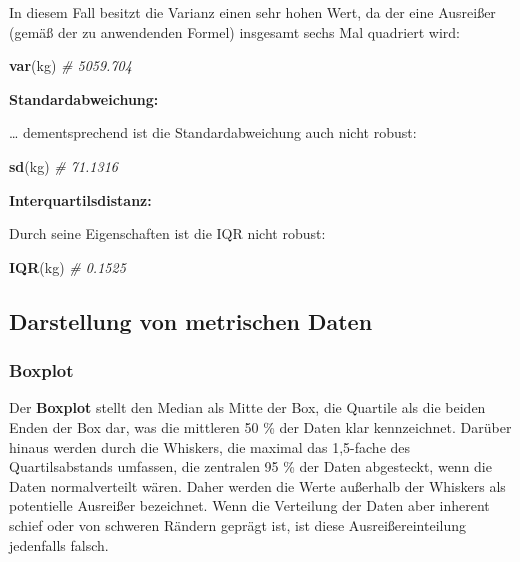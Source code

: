 \documentclass[
]{article}
\newenvironment{Shaded}{\begin{snugshade}}{\end{snugshade}}
\newcommand{\CommentTok}[1]{\textcolor[rgb]{0.56,0.35,0.01}{\textit{#1}}}
\newcommand{\FunctionTok}[1]{\textcolor[rgb]{0.13,0.29,0.53}{\textbf{#1}}}
\newcommand{\NormalTok}[1]{#1}
\begin{document}
In diesem Fall besitzt die Varianz einen sehr hohen Wert, da der eine
Ausreißer (gemäß der zu anwendenden Formel) insgesamt sechs Mal
quadriert wird:

\begin{Shaded}
\begin{Highlighting}[]
\FunctionTok{var}\NormalTok{(kg) }\CommentTok{\# 5059.704}
\end{Highlighting}
\end{Shaded}

\textbf{Standardabweichung:}

\ldots{} dementsprechend ist die Standardabweichung auch nicht robust:

\begin{Shaded}
\begin{Highlighting}[]
\FunctionTok{sd}\NormalTok{(kg) }\CommentTok{\# 71.1316}
\end{Highlighting}
\end{Shaded}

\textbf{Interquartilsdistanz:}

Durch seine Eigenschaften ist die IQR nicht robust:

\begin{Shaded}
\begin{Highlighting}[]
\FunctionTok{IQR}\NormalTok{(kg) }\CommentTok{\# 0.1525}
\end{Highlighting}
\end{Shaded}

\hypertarget{darstellung-von-metrischen-daten}{%
\subsection{Darstellung von metrischen
Daten}\label{darstellung-von-metrischen-daten}}

\hypertarget{boxplot}{%
\subsubsection{Boxplot}\label{boxplot}}

\tcolorbox

Der \textbf{Boxplot} stellt den Median als Mitte der Box, die Quartile
als die beiden Enden der Box dar, was die mittleren 50 \% der Daten klar
kennzeichnet. Darüber hinaus werden durch die Whiskers, die maximal das
1,5-fache des Quartilsabstands umfassen, die zentralen 95 \% der Daten
abgesteckt, wenn die Daten normalverteilt wären. Daher werden die Werte
außerhalb der Whiskers als potentielle Ausreißer bezeichnet. Wenn die
Verteilung der Daten aber inherent schief oder von schweren Rändern
geprägt ist, ist diese Ausreißereinteilung jedenfalls falsch.
\end{document}
